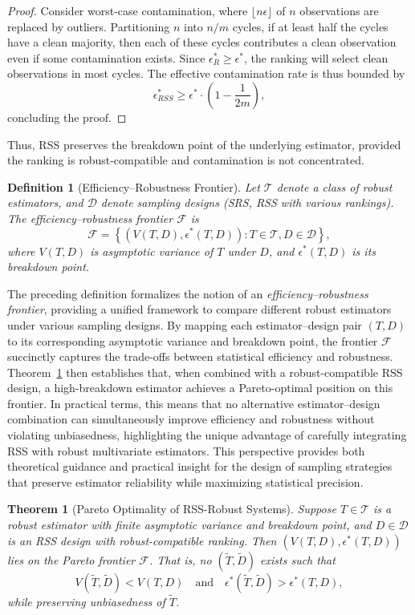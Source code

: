 \documentclass[12pt]{article}
\newtheorem{definition}{Definition}[section] %
\newtheorem{theorem}{Theorem}[section]
\begin{document}
\begin{proof}
Consider worst-case contamination, where $\lfloor n\epsilon \rfloor$ of $n$ observations are replaced by outliers. Partitioning $n$ into $n/m$ cycles, if at least half the cycles have a clean majority, then each of these cycles contributes a clean observation even if some contamination exists. Since $\epsilon^*_R \geq \epsilon^*$, the ranking will select clean observations in most cycles. The effective contamination rate is thus bounded by
\[
\epsilon^*_{RSS} \geq \epsilon^* \cdot \left(1 - \frac{1}{2m} \right),
\]
concluding the proof.
\end{proof}
Thus, RSS preserves the breakdown point of the underlying estimator, provided the ranking is robust-compatible and contamination is not concentrated.
\begin{definition}[Efficiency–Robustness Frontier]
\label{def:frontier}
Let $\mathcal{T}$ denote a class of robust estimators, and $\mathcal{D}$ denote sampling designs (SRS, RSS with various rankings). The \emph{efficiency–robustness frontier} $\mathcal{F}$ is
\[
\mathcal{F} = \left\{ \left(V(T, D), \epsilon^*(T, D)\right) : T \in \mathcal{T}, D \in \mathcal{D} \right\},
\]
where $V(T, D)$ is asymptotic variance of $T$ under $D$, and $\epsilon^*(T, D)$ is its breakdown point.
\end{definition}
The preceding definition formalizes the notion of an \emph{efficiency–robustness frontier}, providing a unified framework to compare different robust estimators under various sampling designs. By mapping each estimator–design pair $(T, D)$ to its corresponding asymptotic variance and breakdown point, the frontier $\mathcal{F}$ succinctly captures the trade-offs between statistical efficiency and robustness. Theorem~\ref{thm:pareto_optimality} then establishes that, when combined with a robust-compatible RSS design, a high-breakdown estimator achieves a Pareto-optimal position on this frontier. In practical terms, this means that no alternative estimator–design combination can simultaneously improve efficiency and robustness without violating unbiasedness, highlighting the unique advantage of carefully integrating RSS with robust multivariate estimators. This perspective provides both theoretical guidance and practical insight for the design of sampling strategies that preserve estimator reliability while maximizing statistical precision.

\begin{theorem}[Pareto Optimality of RSS-Robust Systems]
\label{thm:pareto_optimality}
Suppose $T \in \mathcal{T}$ is a robust estimator with finite asymptotic variance and breakdown point, and $D \in \mathcal{D}$ is an RSS design with robust-compatible ranking. Then $(V(T,D), \epsilon^*(T,D))$ lies on the Pareto frontier $\mathcal{F}$. That is, no $(\tilde{T}, \tilde{D})$ exists such that
\[
V(\tilde{T}, \tilde{D}) < V(T,D) \quad \text{and} \quad \epsilon^*(\tilde{T}, \tilde{D}) > \epsilon^*(T,D),
\]
while preserving unbiasedness of $\tilde{T}$.
\end{theorem}
\end{document}
